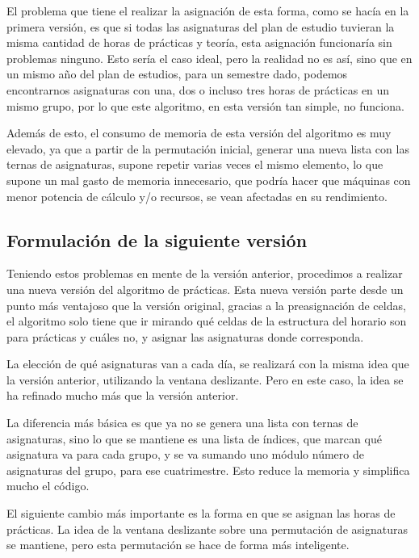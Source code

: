 El problema que tiene el realizar la asignación de esta forma, como se hacía en la primera versión, es que si todas las asignaturas del plan de estudio tuvieran la misma cantidad de horas de prácticas y teoría, esta asignación funcionaría sin problemas ninguno. Esto sería el caso ideal, pero la realidad no es así, sino que en un mismo año del plan de estudios, para un semestre dado, podemos encontrarnos asignaturas con una, dos o incluso tres horas de prácticas en un mismo grupo, por lo que este algoritmo, en esta versión tan simple, no funciona. 

Además de esto, el consumo de memoria de esta versión del algoritmo es muy elevado, ya que a partir de la permutación inicial, generar una nueva lista con las ternas de asignaturas, supone repetir varias veces el mismo elemento, lo que supone un mal gasto de memoria innecesario, que podría hacer que máquinas con menor potencia de cálculo y/o recursos, se vean afectadas en su rendimiento.

\subsection{Formulación de la siguiente versión}

Teniendo estos problemas en mente de la versión anterior, procedimos a realizar una nueva versión del algoritmo de prácticas. Esta nueva versión parte desde un punto más ventajoso que la versión original, gracias a la preasignación de celdas, el algoritmo solo tiene que ir mirando qué celdas de la estructura del horario son para prácticas y cuáles no, y asignar las asignaturas donde corresponda.

La elección de qué asignaturas van a cada día, se realizará con la misma idea que la versión anterior, utilizando la ventana deslizante. Pero en este caso, la idea se ha refinado mucho más que la versión anterior. 

La diferencia más básica es que ya no se genera una lista con ternas de asignaturas, sino lo que se mantiene es una lista de índices, que marcan qué asignatura va para cada grupo, y se va sumando uno módulo número de asignaturas del grupo, para ese cuatrimestre. Esto reduce la memoria y simplifica mucho el código.

El siguiente cambio más importante es la forma en que se asignan las horas de prácticas. La idea de la ventana deslizante sobre una permutación de asignaturas se mantiene, pero esta permutación se hace de forma más inteligente. 

